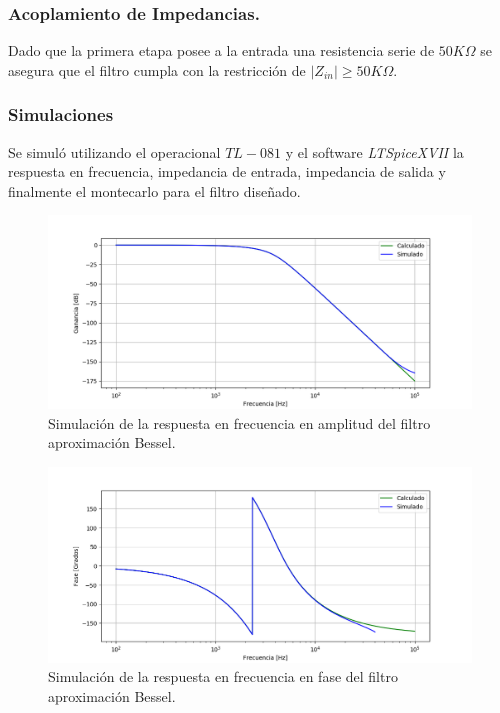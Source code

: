 \subsubsection{Acoplamiento de Impedancias.}
Dado que la primera etapa posee a la entrada una resistencia serie de $50K\Omega$ se asegura que el filtro cumpla con la restricción de $|Z_{in}| \geq 50K\Omega$.

\subsubsection{Simulaciones}

Se simuló utilizando el operacional $TL-081$ y el software \textit{LTSpiceXVII} la respuesta en frecuencia, impedancia de entrada, impedancia de salida y finalmente el montecarlo para el filtro diseñado.

\begin{figure}[H]
\centering
	\centering
	\includegraphics[width=\textwidth]{Imagenes-Ej1/bessel_hs_sim.png}
	\caption{Simulación de la respuesta en frecuencia en amplitud del filtro aproximación Bessel.}
	\label{bes_gain_sim}
\end{figure}

\begin{figure}[H]
\centering
	\centering
	\includegraphics[width=\textwidth]{Imagenes-Ej1/bessel_hspha_sim.png}
	\caption{Simulación de la respuesta en frecuencia en fase del filtro aproximación Bessel.}
	\label{bes_phase_sim}
\end{figure}


